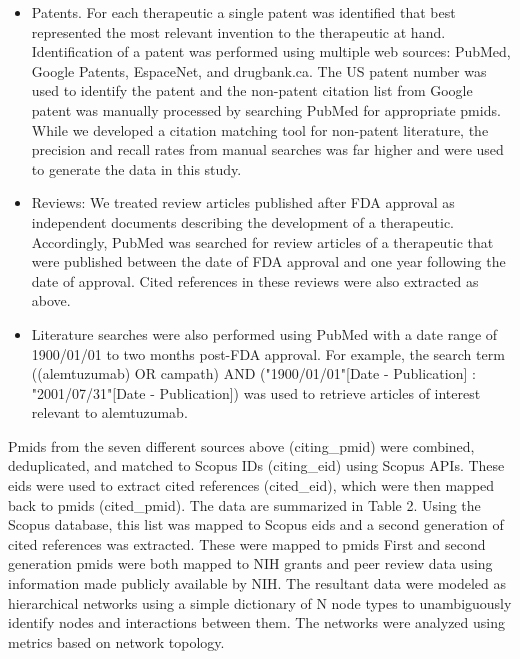\documentclass[10pt,letterpaper]{article}
\begin{document}
\begin {itemize}
\item Patents. For each therapeutic a single patent was identified that best represented the most relevant invention to the therapeutic at hand. Identification of a patent was performed using multiple web sources: PubMed, Google Patents, EspaceNet, and drugbank.ca. The US patent number was used to identify the patent and the non-patent citation list from Google patent was manually processed by searching PubMed for appropriate pmids. While we developed a citation matching tool for non-patent literature, the precision and recall rates from manual searches was far higher and were used to generate the data in this study.

\item Reviews: We treated review articles published after FDA approval  as independent documents describing the development of a therapeutic. Accordingly, PubMed was searched for review articles of a therapeutic that were published between the date of FDA approval and one year following the date of approval. Cited references in these reviews were also extracted as above.

\item Literature searches were also performed using PubMed with a date range of 1900/01/01 to two months post-FDA approval. For example, the search term ((alemtuzumab) OR campath) AND ("1900/01/01"[Date - Publication] : "2001/07/31"[Date - Publication]) was used to retrieve articles of interest relevant to alemtuzumab.
\end{itemize}

Pmids from the seven different sources above (citing\_pmid) were combined, deduplicated, and matched to Scopus IDs (citing\_eid) using Scopus APIs. These eids were used to extract cited references (cited\_eid), which were then mapped back to pmids (cited\_pmid). The data are summarized in Table 2. Using the Scopus database, this list was mapped to Scopus eids and a second generation of cited references was extracted. These were mapped to pmids First and second generation pmids were both mapped to NIH grants and peer review data using information made publicly available by NIH. The resultant data were modeled as hierarchical networks using a simple dictionary of N node types to unambiguously identify nodes and interactions between them. The networks were analyzed using metrics based on network topology.
\end{document}
